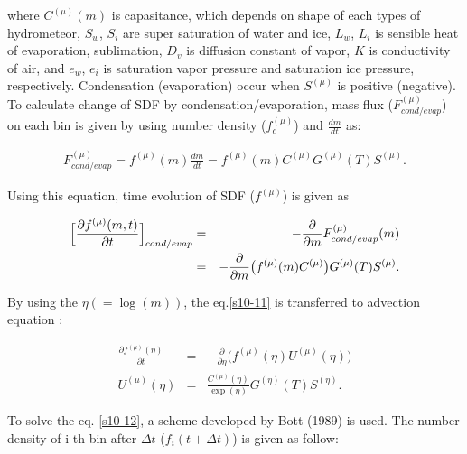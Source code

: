 where $C^{(\mu)}(m)$ is capasitance, which depends on shape of each types of hydrometeor, $S_{w}$, $S_{i}$ are super saturation of water and ice, $L_{w}$, $L_{i}$ is sensible heat of evaporation, sublimation, $D_{v}$ is diffusion constant of vapor, $K$ is conductivity of air, and $e_{w}$, $e_{i}$ is saturation vapor pressure and saturation ice pressure, respectively. Condensation (evaporation) occur when $S^{(\mu)}$ is positive (negative).\\
To calculate change of SDF by condensation/evaporation, mass flux ($F^{(\mu)}_{cond/evap}$) on each bin is given by using number density ($f_{c}^{(\mu)}$) and $\frac{dm}{dt}$ as:

\begin{eqnarray}
F^{(\mu)}_{cond/evap}=f^{(\mu)}(m)\frac{dm}{dt}=f^{(\mu)}(m)C^{(\mu)}G^{(\mu)}(T)S^{(\mu)}.\label{s10-10}
\end{eqnarray}

Using this equation, time evolution of SDF ($f^{(\mu)}$) is given as

\begin{eqnarray}
\Bigl[\frac{\partial f^{(\mu)}(m,t)}{\partial t}\Bigr]_{cond/evap}&=&-\frac{\partial}{\partial m}F^{(\mu)}_{cond/evap}(m)\nonumber\\
&=&-\frac{\partial}{\partial m}\bigl (f^{(\mu)}(m)C^{(\mu)}\bigr ) G^{(\mu)}(T)S^{(\mu)}.\label{s10-11}
\end{eqnarray}


By using the $\eta(=\log(m))$, the eq.\ref{s10-11} is transferred to advection equation :

\begin{eqnarray}
\frac{\partial f^{(\mu)}(\eta)}{\partial t}&=&-\frac{\partial}{\partial \eta}\bigl ( f^{(\mu)}(\eta)U^{(\mu)}(\eta)\bigr)\label{s10-12}\\
U^{(\mu)}(\eta)&=&\frac{C^{(\mu)}(\eta)}{\exp (\eta)}G^{(\eta)}(T)S^{(\eta)}.\nonumber
\end{eqnarray}

To solve the eq. \ref{s10-12}, a scheme developed by Bott (1989)\cite{bott_1989} is used. The number density of i-th bin after $\Delta t$ ($f_{i}(t+\Delta t)$) is given as follow:

